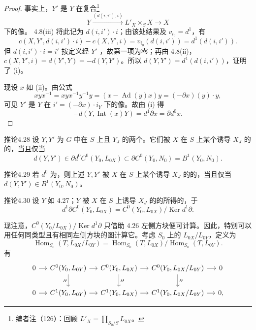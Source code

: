\begin{proof}
事实上，$Y'$ 是 $Y$ 在复合\footnote{编者注（126）：回顾 $L'_X=\prod_{S_0/S}L_{0X}$。}
\[Y\xrightarrow{(d(i,i'),i)}L'_X\times_S X\longrightarrow X\]
下的像。
4.8(iii) 将此记为 $d(i,i')\cdot i$；由该处结果及 $v_{i_0}=d^1$，有
\[c(X,Y',d(i,i')\cdot i)-c(X,Y',i)=v_{i_0}(d(i,i'))=d^1(d(i,i')).\]
但 $d(i,i')\cdot i=i'$ 按定义经 $Y'$ ，故第一项为零；再由 4.8(ii)，$c(X,Y',i)=d(Y',Y)=-d(Y,Y')$。所以 $d(Y,Y')=d^1(d(i,i'))$，证明了 (i)。

现设 $x$ 如 (ii)。由公式
\[xyx^{-1}=xyx^{-1}y^{-1}y=(x-\operatorname{Ad}(y)x)y=(-\partial x)(y)\cdot y,\]
可见 $Y'$ 是 $Y$ 在 $i'=(-\partial x)\cdot i_Y$ 下的像。故由 (i) 得
\[-d(Y,\operatorname{Int}(x)Y)=d^1\partial x=\partial d^0x.\]
\end{proof}
\begin{SGAresult}{推论}{4.28}
设 $Y,Y'$ 为 $G$ 中在 $S$ 上且 $Y_J$ 的两个。它们被 $X$ 在 $S$ 上某个诱导 $X_J$ 的的，当且仅当
\[d(Y,Y')\in\partial d^0C^0(Y_0,L_{0X})\subset\partial C^0(Y_0,N_0)=B^1(Y_0,N_0).\]
\end{SGAresult}
\begin{SGAresult}{推论}{4.29}
若 $d^0$ 为，则上述 $Y,Y'$ 被 $X$ 在 $S$ 上某个诱导 $X_J$ 的的，当且仅当 $d(Y,Y')\in B^1(Y_0,N_0)$。
\end{SGAresult}
\begin{SGAresult}{推论}{4.30}
设 $Y$ 如 4.27；$Y$ 被 $X$ 在 $S$ 上诱导 $X_J$ 的的所得的，于
\[d^1\partial C^0(Y_0,L_{0X})=C^0(Y_0,L_{0X})/\operatorname{Ker}d^1\partial.\]
\end{SGAresult}
现注意，$C^0(Y_0/L_{0X})/\operatorname{Ker}d^1\partial$ 只借助 4.26 左侧方块便可计算。因此，特别可以用任何同类型且有相同左侧方块的图计算它。考虑 $S_0$ 上的 $L_{0X}/L_{0Y}$，定义为
\[\operatorname{Hom}_{S_0}(T,L_{0X}/L_{0Y})=\operatorname{Hom}_{S_0}(T,L_{0X})/\operatorname{Hom}_{S_0}(T,L_{0Y}).\]
有
\[
\begin{tikzcd}[column sep=small]
0\arrow[r]&C^0(Y_0,L_{0Y})\arrow[r]\arrow[d,"\partial"']&C^0(Y_0,L_{0X})\arrow[r]\arrow[d,"\partial"]&C^0(Y_0,L_{0X}/L_{0Y})\arrow[r]\arrow[d,"\partial"]&0\\
0\arrow[r]&C^1(Y_0,L_{0Y})\arrow[r]&C^1(Y_0,L_{0X})\arrow[r]&C^1(Y_0,L_{0X}/L_{0Y})\arrow[r]&0,
\end{tikzcd}
\]
